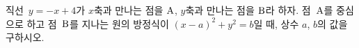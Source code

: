 직선~$y=-x+4$가 $x$축과 만나는 점을 $\mathrm{A}$, $y$축과 만나는 점을 $\mathrm{B}$라 하자. 점~$\mathrm{A}$를 중심으로 하고 점~$\mathrm{B}$를 지나는 원의 방정식이 $(x-a)^2+y^2=b$일 때, 상수 $a$, $b$의 값을 구하시오.
